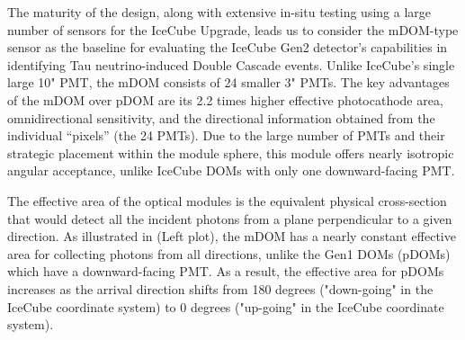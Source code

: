 The maturity of the design, along with extensive in-situ testing using a large number of sensors for the IceCube Upgrade, leads us to consider the mDOM-type sensor as the baseline for evaluating the IceCube Gen2 detector's capabilities in identifying Tau neutrino-induced Double Cascade events. Unlike IceCube’s single large 10" PMT, the mDOM consists of 24 smaller 3" PMTs. The key advantages of the mDOM over pDOM  are its 2.2 times higher effective photocathode area, omnidirectional sensitivity, and the directional information obtained from the individual “pixels” (the 24 PMTs). Due to the large number of PMTs and their strategic placement within the module sphere, this module offers nearly isotropic angular acceptance, unlike IceCube DOMs with only one downward-facing PMT. 

The effective area of the optical modules is the equivalent physical cross-section that would detect all the incident photons from a plane perpendicular to a given direction. As illustrated in  (Left plot), the mDOM has a nearly constant effective area for collecting photons from all directions, unlike the Gen1 DOMs (pDOMs) which have a downward-facing PMT. As a result, the effective area for pDOMs increases as the arrival direction shifts from 180 degrees ("down-going" in the IceCube coordinate system) to 0 degrees ("up-going" in the IceCube coordinate system).

